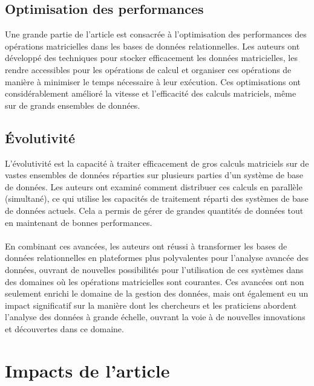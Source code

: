 \documentclass[a4paper, 12pt]{article}
\begin{document}
\subsection{Optimisation des performances}
Une grande partie de l'article est consacrée à l'optimisation des performances des opérations matricielles dans les bases de données relationnelles. Les auteurs ont développé des techniques pour stocker efficacement les données matricielles, les rendre accessibles pour les opérations de calcul et organiser ces opérations de manière à minimiser le temps nécessaire à leur exécution. Ces optimisations ont considérablement amélioré la vitesse et l'efficacité des calculs matriciels, même sur de grands ensembles de données.

\subsection{Évolutivité}
L’évolutivité est la capacité à traiter efficacement de gros calculs matriciels sur de vastes ensembles de données réparties sur plusieurs parties d'un système de base de données. Les auteurs ont examiné comment distribuer ces calculs en parallèle (simultané), ce qui utilise les capacités de traitement réparti des systèmes de base de données actuels. Cela a permis de gérer de grandes quantités de données tout en maintenant de bonnes performances.

\paragraph{}
En combinant ces avancées, les auteurs ont réussi à transformer les bases de données relationnelles en plateformes plus polyvalentes pour l'analyse avancée des données, ouvrant de nouvelles possibilités pour l'utilisation de ces systèmes dans des domaines où les opérations matricielles sont courantes. Ces avancées ont non seulement enrichi le domaine de la gestion des données, mais ont également eu un impact significatif sur la manière dont les chercheurs et les praticiens abordent l'analyse des données à grande échelle, ouvrant la voie à de nouvelles innovations et découvertes dans ce domaine.

\clearpage 
\section{Impacts de l'article}
\end{document}
